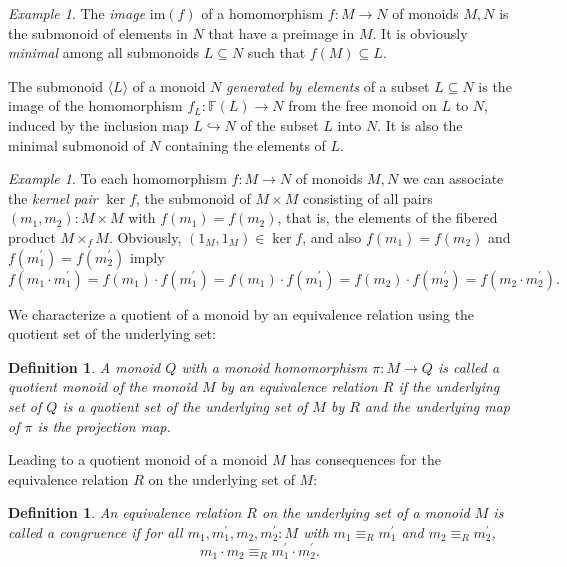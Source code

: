 \documentclass{amsart}
\theoremstyle{plain}
\numberwithin{equation}{section} %
\numberwithin{figure}{section} %
\theoremstyle{plain}
\theoremstyle{plain}
\theoremstyle{plain}
\theoremstyle{plain}
\theoremstyle{plain}
\theoremstyle{plain}
\newtheorem{Def}[thm]{Definition} %
\theoremstyle{remark}
\theoremstyle{remark}
\theoremstyle{remark}
\newtheorem{exm}[thm]{Example}
\begin{document}
\begin{exm}
The \textit{image} $\mathrm{im}(f)$ of a homomorphism $f : M \rightarrow N$ of monoids $M, N$ is the submonoid of elements in $N$ that have a preimage in $M$. It is obviously \textit{minimal} among all submonoids $L \subseteq N$ such that $f(M) \subseteq L$.

The submonoid $\langle L \rangle$ of a monoid $N$ \textit{generated by elements} of a subset $L \subseteq N$ is the image of the homomorphism $f_L : \mathbb{F}(L) \rightarrow N$ from the free monoid on $L$ to $N$, induced by the inclusion map $L \hookrightarrow N$ of the subset $L$ into $N$. It is also the minimal submonoid of $N$ containing the elements of $L$.
\end{exm}

\begin{exm}  %
To each homomorphism $f : M \rightarrow N$ of monoids $M, N$ we can associate the \textit{kernel pair} $\ker f$, the submonoid of $M \times M$ consisting of all pairs $(m_1, m_2) : M \times M$ with $f(m_1) = f(m_2)$, that is, the elements of the fibered product $M \times_f M$. Obviously, $(1_M, 1_M) \in \ker f$, and also $f(m_1) = f(m_2)$ and $f(m_1^\prime) = f(m_2^\prime)$ imply 
\[ f(m_1 \cdot m_1^\prime) = f(m_1) \cdot f(m_1^\prime) = f(m_1) \cdot f(m_1^\prime) = f(m_2) \cdot f(m_2^\prime) = f(m_2 \cdot m_2^\prime). \]
\end{exm}

We characterize a quotient of a monoid by an equivalence relation using the quotient set of the underlying set:
\begin{Def}  \label{quot-monoid-def} %
A monoid $Q$ with a monoid homomorphism $\pi : M \rightarrow Q$ is called a quotient monoid of the monoid $M$ by an equivalence relation $R$ if the underlying set of $Q$ is a quotient set of the underlying set of $M$ by $R$ and the underlying map of $\pi$ is the projection map.
\end{Def}

Leading to a quotient monoid of a monoid $M$ has consequences for the equivalence relation $R$ on the underlying set of $M$:
\begin{Def}  %
An equivalence relation $R$ on the underlying set of a monoid $M$ is called a congruence if for all $m_1, m_1^\prime, m_2, m_2^\prime : M$ with $m_1 \equiv_R m_1^\prime$ and $m_2 \equiv_R m_2^\prime$, 
\[ m_1 \cdot m_2 \equiv_R m_1^\prime \cdot m_2^\prime. \]
\end{Def} 
\end{document}
